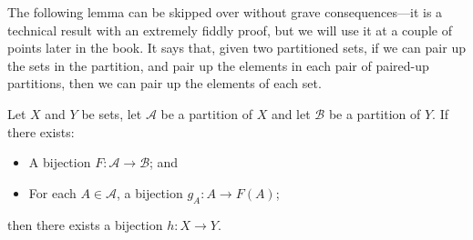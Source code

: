 The following lemma can be skipped over without grave consequences---it is a technical result with an extremely fiddly proof, but we will use it at a couple of points later in the book. It says that, given two partitioned sets, if we can pair up the sets in the partition, and pair up the elements in each pair of paired-up partitions, then we can pair up the elements of each set.

\begin{lemma}
\label{lemBijectionBetweenPartitionAndComponentsInducesBijectionOfSets}
Let $X$ and $Y$ be sets, let $\mathcal{A}$ be a partition of $X$ and let $\mathcal{B}$ be a partition of $Y$. If there exists:
\begin{itemize}
\item A bijection $F : \mathcal{A} \to \mathcal{B}$; and
\item For each $A \in \mathcal{A}$, a bijection $g_A : A \to F(A)$;
\end{itemize}
then there exists a bijection $h : X \to Y$.
\end{lemma}

